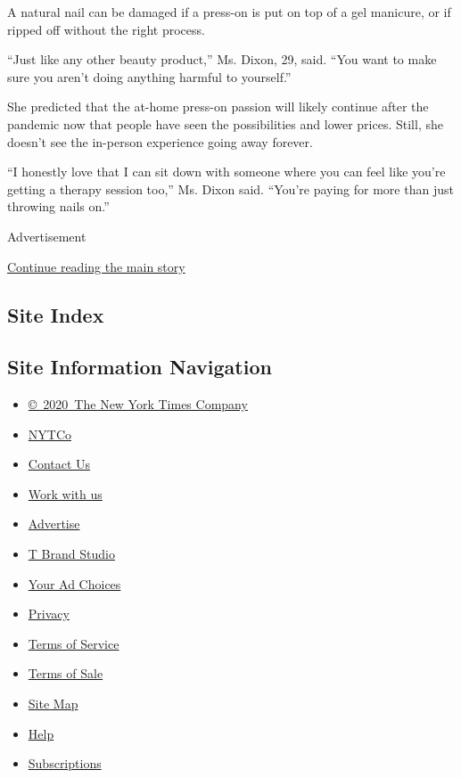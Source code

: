 A natural nail can be damaged if a press-on is put on top of a gel
manicure, or if ripped off without the right process.

``Just like any other beauty product,'' Ms. Dixon, 29, said. ``You want
to make sure you aren't doing anything harmful to yourself.''

She predicted that the at-home press-on passion will likely continue
after the pandemic now that people have seen the possibilities and lower
prices. Still, she doesn't see the in-person experience going away
forever.

``I honestly love that I can sit down with someone where you can feel
like you're getting a therapy session too,'' Ms. Dixon said. ``You're
paying for more than just throwing nails on.''

Advertisement

\protect\hyperlink{after-bottom}{Continue reading the main story}

\hypertarget{site-index}{%
\subsection{Site Index}\label{site-index}}

\hypertarget{site-information-navigation}{%
\subsection{Site Information
Navigation}\label{site-information-navigation}}

\begin{itemize}
\tightlist
\item
  \href{https://help.nytimes.com/hc/en-us/articles/115014792127-Copyright-notice}{©~2020~The
  New York Times Company}
\end{itemize}

\begin{itemize}
\tightlist
\item
  \href{https://www.nytco.com/}{NYTCo}
\item
  \href{https://help.nytimes.com/hc/en-us/articles/115015385887-Contact-Us}{Contact
  Us}
\item
  \href{https://www.nytco.com/careers/}{Work with us}
\item
  \href{https://nytmediakit.com/}{Advertise}
\item
  \href{http://www.tbrandstudio.com/}{T Brand Studio}
\item
  \href{https://www.nytimes.com/privacy/cookie-policy\#how-do-i-manage-trackers}{Your
  Ad Choices}
\item
  \href{https://www.nytimes.com/privacy}{Privacy}
\item
  \href{https://help.nytimes.com/hc/en-us/articles/115014893428-Terms-of-service}{Terms
  of Service}
\item
  \href{https://help.nytimes.com/hc/en-us/articles/115014893968-Terms-of-sale}{Terms
  of Sale}
\item
  \href{https://spiderbites.nytimes.com}{Site Map}
\item
  \href{https://help.nytimes.com/hc/en-us}{Help}
\item
  \href{https://www.nytimes.com/subscription?campaignId=37WXW}{Subscriptions}
\end{itemize}
